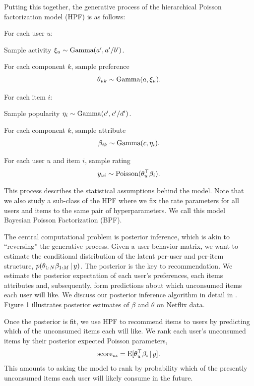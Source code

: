 Putting this together, the generative process of the hierarchical
Poisson factorization model (HPF) is as follows:
\begin{enumerate*}
\item For each user $u$:
  \begin{enumerate*}
  \item Sample activity $\xi_u \sim \textrm{Gamma}(a', a'/b')$.
  \item For each component $k$, sample preference $$\theta_{uk} \sim
    \textrm{Gamma}(a, \xi_u).$$
  \end{enumerate*}

\item For each item $i$:
  \begin{enumerate*}
    \item Sample popularity $\eta_i \sim \textrm{Gamma}(c', c'/d')$.
    \item For each component $k$, sample attribute
      $$\beta_{ik} \sim \textrm{Gamma}(c, \eta_i).$$
  \end{enumerate*}

\item For each user $u$ and item $i$, sample rating
  $$y_{ui} \sim
  \textrm{Poisson}(\theta_u^\top \beta_i).$$
\end{enumerate*}
This process describes the statistical assumptions behind the model.
Note that we also study a sub-class of the HPF where we fix the rate
parameters for all users and items to the same pair of
hyperparameters. We call this model Bayesian Poisson Factorization
(BPF).

The central computational problem is posterior inference, which is
akin to ``reversing'' the generative process.  Given a user behavior
matrix, we want to estimate the conditional distribution of the latent
per-user and per-item structure, $p(\theta_{1:N} \beta_{1:M} \,\vert\, y)$.
The posterior is the key to recommendation.  We estimate the posterior
expectation of each user's preferences, each items attributes and,
subsequently, form predictions about which unconsumed items each user
will like.  We discuss our posterior inference algorithm in detail in
.  Figure 1 illustrates posterior estimates of
$\beta$ and $\theta$ on Netflix data.



Once the posterior is fit, we use HPF to recommend items to users by
predicting which of the unconsumed items each will like.  We rank each
user's unconsumed items by their posterior expected Poisson
parameters,
\begin{equation}
  \label{eq:score}
  \textrm{score}_{ui} = \textrm{E}[\theta_u^\top \beta_i \,\vert\, y].
\end{equation}
This amounts to asking the model to rank by probability which of the
presently unconsumed items each user will likely consume in the
future.

